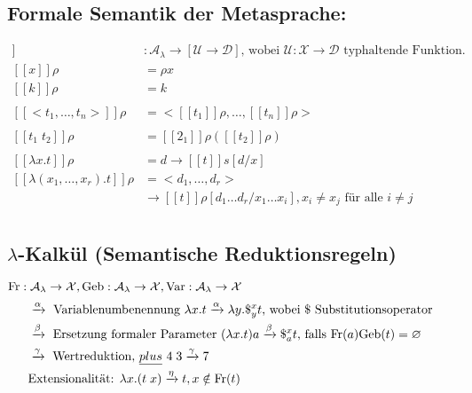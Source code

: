 \subsection{Formale Semantik der Metasprache:}
\begin{align*}
[\![ \; ]\!] &: \mathcal{A}_\lambda \rightarrow [\mathcal{U} \rightarrow \mathcal{D}] \text{, wobei } \mathcal{U}:\mathcal{X} \rightarrow \mathcal{D} \text{ typhaltende Funktion.}\\
[\![ x ]\!] \rho &= \rho x \\
[\![ k ]\!] \rho &= k \tag{1}\\
\\
[\![ <t_1, \dots, t_n> ]\!] \rho &= <[\![ t_1 ]\!]\rho, \dots , [\![ t_n ]\!] \rho > \tag{2}\\
\\
[\![ t_1 \; t_2 ]\!] \rho &= [\![ 2_1 ]\!] \rho ([\![ t_2 ]\!] \rho)  \tag{3}\\
\\
[\![\lambda x.t ]\!] \rho &= d \rightarrow [\![ t ]\!] s [d/x] \tag{4a}\\
[\![ \lambda (x_1,\dots, x_r).t ]\!] \rho &= <d_1, \dots , d_r> \\
&\rightarrow [\![ t ]\!] \rho [d_1 \dots d_r / x_1 \dots x_i], x_i \neq x_j \text{ für alle } i \neq j \tag{4b}\\
\end{align*}

\subsection{$\lambda$-Kalkül (Semantische Reduktionsregeln)}
$\text{\lstinline!Fr!} : \mathcal{A}_\lambda \rightarrow \mathcal{X}, \text{\lstinline!Geb!}: \mathcal{A}_\lambda \rightarrow \mathcal{X}, \text{\lstinline!Var!} : \mathcal{A}_\lambda \rightarrow \mathcal{X}$ 
\begin{align*}
&\xrightarrow{\alpha} \text{ Variablenumbenennung } \lambda x.t \xrightarrow{\alpha} \lambda y. \$^x_y t \text{, wobei } \$ \text{ Substitutionsoperator}\\
&\xrightarrow{\beta}	\text{ Ersetzung formaler Parameter } (\lambda x.t) a \xrightarrow{\beta}	\$^x_a t \text{, falls } \text{\lstinline!Fr!}(a) \text{\lstinline!Geb!}(t) = \varnothing\\
&\xrightarrow{\gamma} \text{ Wertreduktion, } \underline{plus}\ 4\; 3 \xrightarrow{\gamma} 7 \\
&\text{Extensionalität: } \lambda x.(t\;x) \xrightarrow{\eta} t, x \notin \text{\lstinline!Fr!}(t)\\ 
\end{align*}